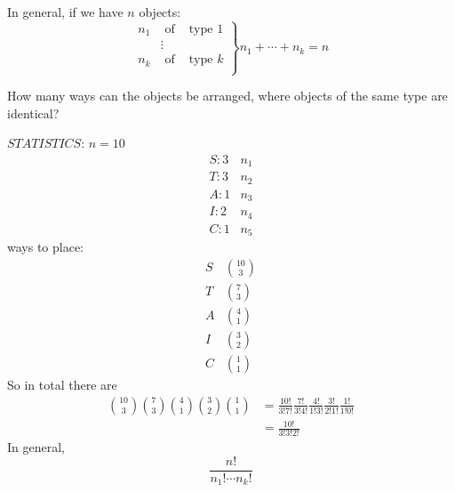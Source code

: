In general, if we have $ n $ objects:
\[
    \left.
    \begin{array}{ccc}
        n_1 & \text{ of } & \text{type $1$} \\
            & \vdots                        \\
        n_k & \text{ of } & \text{type $k$} \\
    \end{array}
    \right\}
    n_1+\dotsb+n_k=n
\]

How many ways can the objects be arranged, where objects
of the same type are identical?

$STATISTICS$: $ n=10 $
\[
    \begin{array}{cc}
        S:3 & n_1 \\
        T:3 & n_2 \\
        A:1 & n_3 \\
        I:2 & n_4 \\
        C:1 & n_5
    \end{array}
\]
ways to place:
\[
    \begin{array}{cc}
        S & \binom{10}{3} \\
        T & \binom{7}{3}  \\
        A & \binom{4}{1}  \\
        I & \binom{3}{2}  \\
        C & \binom{1}{1}
    \end{array}
\]
So in total there are
\begin{align*}
    \binom{10}{3}\binom{7}{3}\binom{4}{1}\binom{3}{2}\binom{1}{1} & =
    \frac{10!}{3!7!}\frac{7!}{3!4!} \frac{4!}{1!3!} \frac{3!}{2!1!}\frac{1!}{1!0!}      \\
                                                                  & =\frac{10!}{3!3!2!}
\end{align*}
In general,
\[ \frac{n!}{n_1!\cdots n_k!} \]
